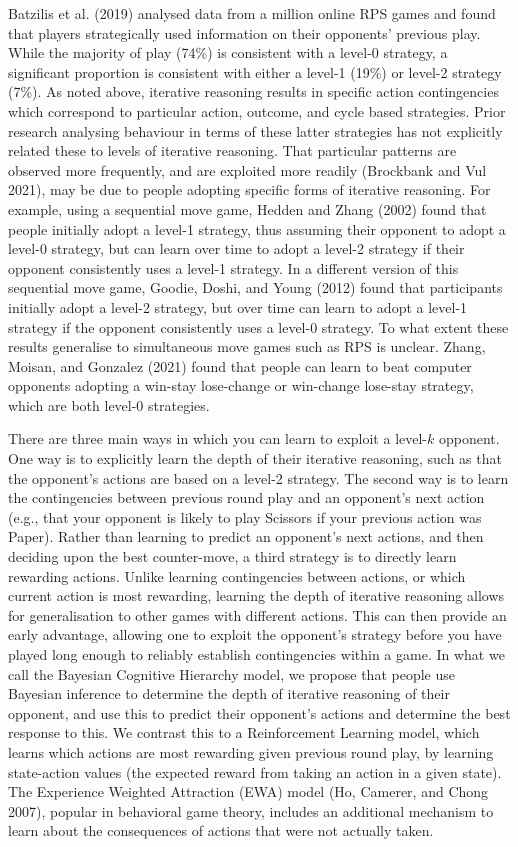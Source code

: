 \documentclass[smallextended]{svjour3}       %
\begin{document}
Batzilis et al. (2019) analysed data from a million online RPS games and
found that players strategically used information on their opponents'
previous play. While the majority of play (74\%) is consistent with a
level-0 strategy, a significant proportion is consistent with either a
level-1 (19\%) or level-2 strategy (7\%). As noted above, iterative
reasoning results in specific action contingencies which correspond to
particular action, outcome, and cycle based strategies. Prior research
analysing behaviour in terms of these latter strategies has not
explicitly related these to levels of iterative reasoning. That
particular patterns are observed more frequently, and are exploited more
readily (Brockbank and Vul 2021), may be due to people adopting specific
forms of iterative reasoning. For example, using a sequential move game,
Hedden and Zhang (2002) found that people initially adopt a level-1
strategy, thus assuming their opponent to adopt a level-0 strategy, but
can learn over time to adopt a level-2 strategy if their opponent
consistently uses a level-1 strategy. In a different version of this
sequential move game, Goodie, Doshi, and Young (2012) found that
participants initially adopt a level-2 strategy, but over time can learn
to adopt a level-1 strategy if the opponent consistently uses a level-0
strategy. To what extent these results generalise to simultaneous move
games such as RPS is unclear. Zhang, Moisan, and Gonzalez (2021) found
that people can learn to beat computer opponents adopting a win-stay
lose-change or win-change lose-stay strategy, which are both level-0
strategies.

There are three main ways in which you can learn to exploit a
level-\(k\) opponent. One way is to explicitly learn the depth of their
iterative reasoning, such as that the opponent's actions are based on a
level-2 strategy. The second way is to learn the contingencies between
previous round play and an opponent's next action (e.g., that your
opponent is likely to play Scissors if your previous action was Paper).
Rather than learning to predict an opponent's next actions, and then
deciding upon the best counter-move, a third strategy is to directly
learn rewarding actions. Unlike learning contingencies between actions,
or which current action is most rewarding, learning the depth of
iterative reasoning allows for generalisation to other games with
different actions. This can then provide an early advantage, allowing
one to exploit the opponent's strategy before you have played long
enough to reliably establish contingencies within a game. In what we
call the Bayesian Cognitive Hierarchy model, we propose that people use
Bayesian inference to determine the depth of iterative reasoning of
their opponent, and use this to predict their opponent's actions and
determine the best response to this. We contrast this to a Reinforcement
Learning model, which learns which actions are most rewarding given
previous round play, by learning state-action values (the expected
reward from taking an action in a given state). The Experience Weighted
Attraction (EWA) model (Ho, Camerer, and Chong 2007), popular in
behavioral game theory, includes an additional mechanism to learn about
the consequences of actions that were not actually taken.
\end{document}
